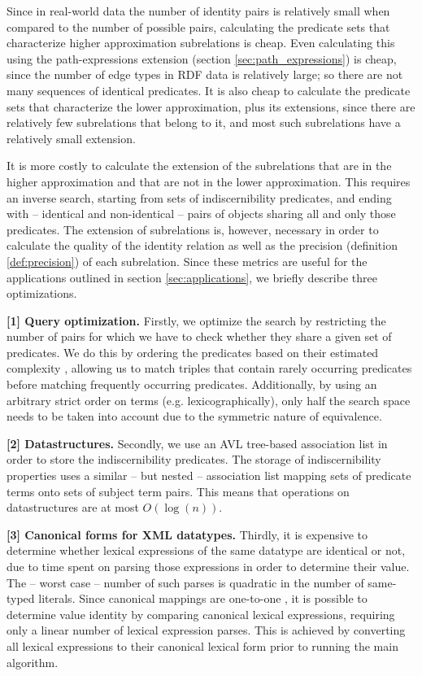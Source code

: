 Since in real-world data the number of identity pairs
  is relatively small when compared to the number of possible pairs,
  calculating the predicate sets that characterize higher approximation
  subrelations is cheap.
Even calculating this using the path-expressions extension
  (section \ref{sec:path_expressions})
  is cheap, since the number of edge types in RDF data is relatively large;
  so there are not many sequences of identical predicates.
It is also cheap to calculate the predicate sets that characterize
  the lower approximation, plus its extensions,
  since there are relatively few subrelations that belong to it,
  and most such subrelations have a relatively small extension.

It is more costly to calculate the extension of the subrelations that are
  in the higher approximation and that are not in the lower approximation.
This requires an inverse search, starting from sets of
  indiscernibility predicates, and ending with
  -- identical and non-identical --
  pairs of objects sharing all and only those predicates.
The extension of subrelations is, however, necessary in order to
  calculate the quality of the identity relation
  as well as the precision (definition \ref{def:precision})
  of each subrelation.
Since these metrics are useful for the applications outlined
  in section \ref{sec:applications},
  we briefly describe three optimizations.

\textbf{[1] Query optimization.}
Firstly, we optimize the search by restricting the number of pairs
  for which we have to check whether they share a given set of predicates.
We do this by ordering the predicates based on their
  estimated complexity \cite{Wielemaker2005},
  allowing us to match triples that contain rarely occurring predicates
  before matching frequently occurring predicates.
Additionally, by using an arbitrary strict order on terms
  (e.g. lexicographically),
  only half the search space needs to be taken into account
  due to the symmetric nature of equivalence.

\textbf{[2] Datastructures.}
Secondly, we use an AVL tree-based association list
  in order to store the indiscernibility predicates.
The storage of indiscernibility properties uses a similar -- but nested --
  association list mapping sets of predicate terms onto
  sets of subject term pairs.
This means that operations on datastructures are at most $O(\log(n))$.

\textbf{[3] Canonical forms for XML datatypes.}
Thirdly, it is expensive to determine whether lexical expressions
  of the same datatype are identical or not,
  due to time spent on parsing those expressions
  in order to determine their value.
The -- worst case -- number of such parses is quadratic
  in the number of same-typed literals.
Since canonical mappings are one-to-one \cite{XmlSchema2012},
  it is possible to determine value identity by comparing
  canonical lexical expressions,
  requiring only a linear number of lexical expression parses.
This is achieved by converting all lexical expressions
  to their canonical lexical form prior to running the main algorithm.

